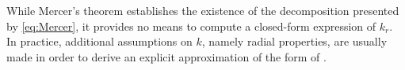 \begin{remark}
	While Mercer's theorem establishes the existence of the decomposition presented by \eqref{eq:Mercer}, it provides no means to compute a closed-form expression of $k_r$. In practice, additional assumptions on $k$, namely radial properties, are usually made in order to derive an explicit approximation of the form of .
\end{remark}
